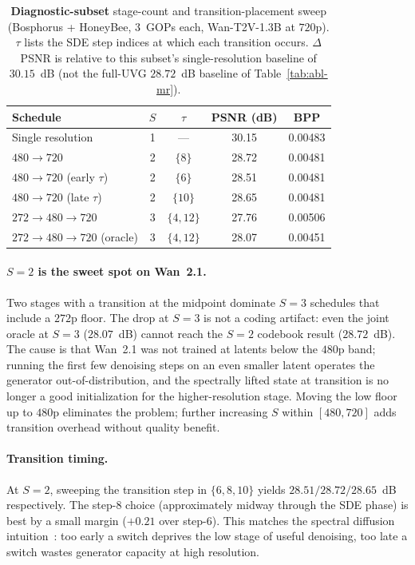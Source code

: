 \begin{table}[t]
\centering
\caption{\textbf{Diagnostic-subset} stage-count and transition-placement
sweep (Bosphorus + HoneyBee, $3$~GOPs each, Wan-T2V-1.3B at $720$p).
$\tau$ lists the SDE step indices at which each transition occurs.
$\Delta$PSNR is relative to this subset's single-resolution baseline of
$30.15$~dB (not the full-UVG $28.72$~dB baseline of
Table~\ref{tab:abl-mr}).}
\label{tab:abl-stages}
\small
\begin{tabular}{@{}l c c c c@{}}
\toprule
Schedule & $S$ & $\tau$ & PSNR (dB) & BPP \\
\midrule
Single resolution         & 1 & --- & 30.15 & 0.00483 \\
\rowcolor{wacvblue!10}
$480 \!\to\! 720$            & 2 & $\{8\}$    & 28.72 & 0.00481 \\
$480 \!\to\! 720$ (early $\tau$) & 2 & $\{6\}$ & 28.51 & 0.00481 \\
$480 \!\to\! 720$ (late $\tau$)  & 2 & $\{10\}$ & 28.65 & 0.00481 \\
$272 \!\to\! 480 \!\to\! 720$     & 3 & $\{4,12\}$ & 27.76 & 0.00506 \\
$272 \!\to\! 480 \!\to\! 720$ (oracle) & 3 & $\{4,12\}$ & 28.07 & 0.00451 \\
\bottomrule
\end{tabular}
\end{table}

\paragraph{$S\!=\!2$ is the sweet spot on Wan~2.1.}
Two stages with a transition at the midpoint dominate $S\!=\!3$ schedules
that include a $272$p floor. The drop at $S\!=\!3$ is not a coding
artifact: even the joint oracle at $S\!=\!3$ ($28.07$~dB) cannot reach
the $S\!=\!2$ codebook result ($28.72$~dB). The cause is that Wan~2.1
was not trained at latents below the $480$p band; running the first few
denoising steps on an even smaller latent operates the generator
out-of-distribution, and the spectrally lifted state at transition is no
longer a good initialization for the higher-resolution stage. Moving the
low floor up to $480$p eliminates the problem; further increasing $S$
within $[480, 720]$ adds transition overhead without quality benefit.

\paragraph{Transition timing.}
At $S\!=\!2$, sweeping the transition step in $\{6, 8, 10\}$ yields
$28.51 / 28.72 / 28.65$~dB respectively. The step-$8$ choice
(approximately midway through the SDE phase) is best by a small margin
($+0.21$ over step-$6$). This matches the spectral diffusion
intuition~\cite{xiao2026spd}: too early a switch deprives the low stage
of useful denoising, too late a switch wastes generator capacity at high
resolution.

